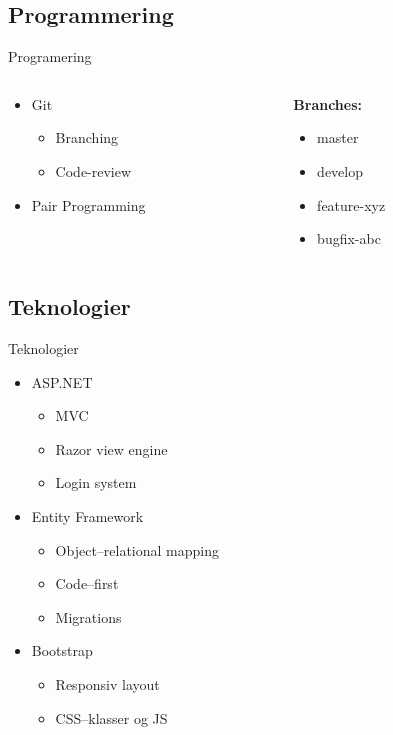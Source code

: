 		\subsection{Programmering}
			\begin{frame}{Programering}
				\begin{columns}
					\begin{column}{.48\textwidth}
						\begin{itemize}
							\item Git
							\begin{itemize}
								\item Branching
								\item Code-review
							\end{itemize}
							\item Pair Programming
							
						\end{itemize}

					\end{column}
					\begin{column}{.48\textwidth}
						\textbf{Branches:}
						\begin{itemize}
							\item master
							\item develop
							\item feature-xyz
							\item bugfix-abc
						\end{itemize}
					\end{column}
				\end{columns}
			\end{frame}


		\subsection{Teknologier}
			\begin{frame}[t]{Teknologier} %
				\begin{itemize}
					\item<1> ASP.NET
					\begin{itemize}
						\item<1> MVC
						\item<1> Razor view engine
						\item<1> Login system
					\end{itemize}
					\item<2> Entity Framework
					\begin{itemize}
						\item<2> Object--relational mapping
						\item<2> Code--first
						\item<2> Migrations
					\end{itemize}
					\item<3> Bootstrap
					\begin{itemize}
						\item<3> Responsiv layout
						\item<3> CSS--klasser og JS
					\end{itemize}
				\end{itemize}
			\end{frame}

